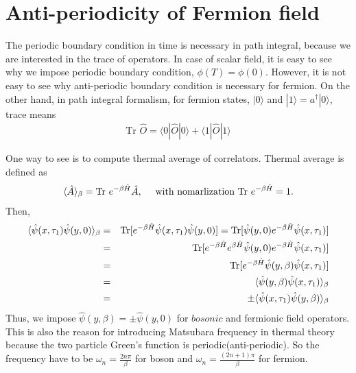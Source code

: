 \documentclass[10pt]{book}
\newcommand{\bea}{\begin{eqnarray}}
\newcommand{\eea}{\end{eqnarray}}
\newcommand{\no}{\nonumber \\}
\def\la{\langle}
\def\ra{\rangle}
\begin{document}
\section{Anti-periodicity of Fermion field}
The periodic boundary condition in time is necessary in path integral,
because we are interested in the trace of operators.
In case of scalar field, 
it is easy to see why we impose periodic boundary condition,
$\phi(T)=\phi(0)$. However, it is not easy to see why anti-periodic boundary condition 
is necessary for fermion.
On the other hand, in path integral formalism, for fermion states,
$|0\ra $ and $|1\ra=a^\dagger|0\ra$, trace means 
\bea 
\mbox{Tr } \hat{O}=\la 0|\hat{O}|0\ra+\la 1|\hat{O}|1\ra
\eea  

One way to see is to compute thermal average of correlators. Thermal average 
is defined as
\bea
\la \hat{A}\ra_\beta ={\rm Tr }\ e^{-\beta \hat{H}}\hat{A}, \quad 
\mbox{ with nomarlization } {\rm Tr}\ e^{-\beta\hat{H}}=1.  
\eea
Then, 
\bea
\la \hat{\psi}(x,\tau_1)\hat{\psi}(y,0)\ra_\beta
&=&{\rm Tr}[e^{-\beta\hat{H}}\hat{\psi}(x,\tau_1)\hat{\psi}(y,0)]
  ={\rm Tr}[\hat{\psi}(y,0) e^{-\beta\hat{H}}\hat{\psi}(x,\tau_1)] \no 
&=&{\rm Tr}[e^{-\beta\hat{H}}e^{\beta\hat{H}}\hat{\psi}(y,0) 
            e^{-\beta\hat{H}}\hat{\psi}(x,\tau_1)] \no
&=&{\rm Tr}[e^{-\beta\hat{H}}\hat{\psi}(y,\beta) 
            \hat{\psi}(x,\tau_1)] \no
&=&\la \hat{\psi}(y,\beta)\hat{\psi}(x,\tau_1)\ra_\beta \no 
&=&\pm \la \hat{\psi}(x,\tau_1)\hat{\psi}(y,\beta)\ra_\beta               
\eea
Thus, we impose $\hat{\psi}(y,\beta)=\pm \hat{\psi}(y,0)$ for $bosonic$
and fermionic field operators. This is also the reason 
for introducing Matsubara frequency in thermal theory because the
two particle Green's function is periodic(anti-periodic).
So the frequency have to be 
$\omega_n=\frac{ 2n\pi}{\beta}$ for boson and
$\omega_n=\frac{(2n+1)\pi}{\beta}$ for fermion. 
\end{document}
